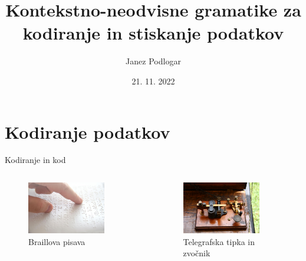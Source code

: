 \documentclass{beamer}
\title[Gramatike za kodiranje podatkov]{Kontekstno-neodvisne gramatike za kodiranje in stiskanje podatkov}
\author{Janez Podlogar}
\institute[UL-FMF]{Univerza v Ljubljani, Fakulteta za matematiko in fiziko}
\date[November 2022]{21. 11. 2022}
\theoremstyle{definition} %
\begin{document}
\begin{frame}
    \titlepage
\end{frame}

\section{Kodiranje podatkov}

\begin{frame}{Kodiranje in kod}

\begin{columns}[c]
    \begin{column}{.5\textwidth}
        \begin{figure}
            \centering
            \includegraphics[width=0.8\textwidth]{Braillova_pisava.jpg}
            \caption{Braillova pisava}
        \end{figure}
    \end{column}

    \begin{column}{.5\textwidth}
        \begin{figure}
            \centering
            \includegraphics[width=0.8\textwidth]{Key_Sounder.jpg}
            \caption{Telegrafska tipka in zvočnik}
        \end{figure}
    \end{column}
\end{columns}

\end{frame}
\end{document}

